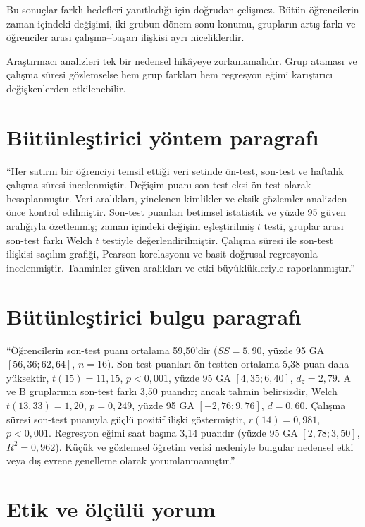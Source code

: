 Bu sonuçlar farklı hedefleri yanıtladığı için doğrudan çelişmez. Bütün
öğrencilerin zaman içindeki değişimi, iki grubun dönem sonu konumu, grupların
artış farkı ve öğrenciler arası çalışma--başarı ilişkisi ayrı niceliklerdir.

Araştırmacı analizleri tek bir nedensel hikâyeye zorlamamalıdır. Grup ataması
ve çalışma süresi gözlemselse hem grup farkları hem regresyon eğimi karıştırıcı
değişkenlerden etkilenebilir.

\section{Bütünleştirici yöntem paragrafı}

``Her satırın bir öğrenciyi temsil ettiği veri setinde ön-test, son-test ve
haftalık çalışma süresi incelenmiştir. Değişim puanı son-test eksi ön-test
olarak hesaplanmıştır. Veri aralıkları, yinelenen kimlikler ve eksik gözlemler
analizden önce kontrol edilmiştir. Son-test puanları betimsel istatistik ve
yüzde 95 güven aralığıyla özetlenmiş; zaman içindeki değişim eşleştirilmiş
$t$ testi, gruplar arası son-test farkı Welch $t$ testiyle değerlendirilmiştir.
Çalışma süresi ile son-test ilişkisi saçılım grafiği, Pearson korelasyonu ve
basit doğrusal regresyonla incelenmiştir. Tahminler güven aralıkları ve etki
büyüklükleriyle raporlanmıştır.''

\section{Bütünleştirici bulgu paragrafı}

``Öğrencilerin son-test puanı ortalama 59,50'dir ($SS=5{,}90$, yüzde 95 GA
$[56{,}36;62{,}64]$, $n=16$). Son-test puanları ön-testten ortalama 5,38
puan daha yüksektir, $t(15)=11{,}15$, $p<0{,}001$, yüzde 95 GA
$[4{,}35;6{,}40]$, $d_z=2{,}79$. A ve B gruplarının son-test farkı 3,50
puandır; ancak tahmin belirsizdir, Welch $t(13{,}33)=1{,}20$, $p=0{,}249$,
yüzde 95 GA $[-2{,}76;9{,}76]$, $d=0{,}60$. Çalışma süresi son-test
puanıyla güçlü pozitif ilişki göstermiştir, $r(14)=0{,}981$, $p<0{,}001$.
Regresyon eğimi saat başına 3,14 puandır (yüzde 95 GA $[2{,}78;3{,}50]$,
$R^2=0{,}962$). Küçük ve gözlemsel öğretim verisi nedeniyle bulgular nedensel
etki veya dış evrene genelleme olarak yorumlanmamıştır.''

\section{Etik ve ölçülü yorum}

